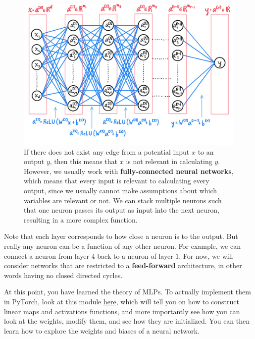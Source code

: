\begin{definition}
    \begin{figure}[H]
      \centering 
      \includegraphics[scale=0.17]{img/01_MLP/Multilayer_Neural_Net.jpg}
      \caption{If there does not exist any edge from a potential input $x$ to an output $y$, then this means that $x$ is not relevant in calculating $y$. However, we usually work with \textbf{fully-connected neural networks}, which means that every input is relevant to calculating every output, since we usually cannot make assumptions about which variables are relevant or not. We can stack multiple neurons such that one neuron passes its output as input into the next neuron, resulting in a more complex function. } 
      \label{fig:multilayer_neural_net}
    \end{figure}
  \end{definition}

  Note that each layer corresponds to how close a neuron is to the output. But really any neuron can be a function of any other neuron. For example, we can connect a neuron from layer $4$ back to a neuron of layer $1$. For now, we will consider networks that are restricted to a \textbf{feed-forward} architecture, in other words having no closed directed cycles. 

  \begin{code} 
    At this point, you have learned the theory of MLPs. To actually implement them in PyTorch, look at this module \href{code/01_MLP/parameters.ipynb}{here}, which will tell you on how to construct linear maps and activations functions, and more importantly see how you can look at the weights, modify them, and see how they are initialized. You can then learn how to explore the weights and biases of a neural network. 
  \end{code}

